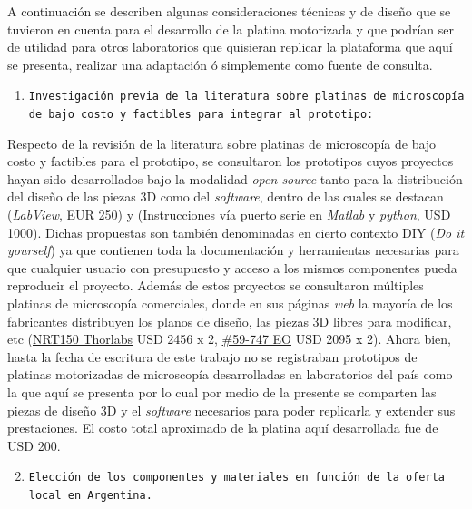 A continuación se describen algunas consideraciones técnicas y de diseño que se tuvieron en cuenta para el desarrollo de la platina motorizada y que podrían ser de utilidad para otros laboratorios que quisieran replicar la plataforma que aquí se presenta, realizar una adaptación ó simplemente como fuente de consulta.


\begin{enumerate}
\item \texttt{Investigación previa de la literatura sobre platinas de microscopía de bajo costo y factibles para integrar al prototipo:}
\end{enumerate}

Respecto de la revisión de la literatura sobre platinas de microscopía de bajo costo y factibles para el prototipo, se consultaron  los prototipos cuyos proyectos hayan sido desarrollados bajo la modalidad \textit{open source} tanto para la distribución del diseño de las piezas 3D como del \textit{software}, dentro de las cuales se destacan \cite{schaa}(\textit{LabView}, EUR 250) y \cite{campbells}(Instrucciones vía puerto serie en \textit{Matlab} y \textit{python}, USD 1000). Dichas propuestas son también denominadas en cierto contexto DIY (\textit{Do it yourself}) ya que contienen toda la documentación y herramientas necesarias para que cualquier usuario con presupuesto y acceso a los mismos componentes pueda reproducir el proyecto. Además de estos proyectos se consultaron múltiples platinas de microscopía comerciales, donde en sus páginas \textit{web} la mayoría de los fabricantes distribuyen los planos de diseño, las piezas 3D libres para modificar, etc (\href{https://www.thorlabs.com/newgrouppage9.cfm?objectgroup\_id=2132}{NRT150 Thorlabs} USD 2456 x 2, \href{https://www.edmundoptics.com/p/150mm-motorized-stage/16419/}{\#59-747 EO} USD 2095 x 2). Ahora bien, hasta la fecha de escritura de este trabajo no se registraban prototipos de platinas motorizadas de microscopía desarrolladas en laboratorios del país como la que aquí se presenta por lo cual por medio de la presente se comparten las piezas de diseño 3D y el \textit{software} necesarios para poder replicarla y extender sus prestaciones. El costo total aproximado de la platina aquí desarrollada fue de USD 200.

\begin{enumerate}
  \setcounter{enumi}{1}
  \item \texttt{Elección de los componentes y materiales en función de la oferta local en Argentina.}
\end{enumerate}

